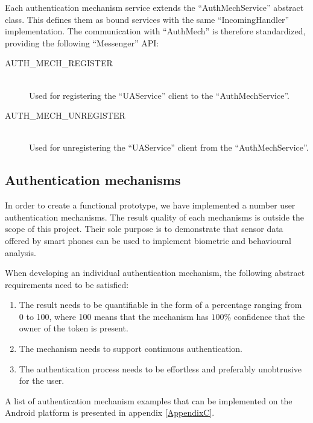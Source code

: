 Each authentication mechanism service extends the ``AuthMechService'' abstract class. This defines them as bound services with the same ``IncomingHandler'' implementation. The communication with ``AuthMech'' is therefore standardized, providing the following ``Messenger'' API:
\begin{description}
  \item[AUTH\_MECH\_REGISTER] \hfill \\
  Used for registering the ``UAService'' client to the ``AuthMechService''.
  
  \item[AUTH\_MECH\_UNREGISTER] \hfill \\
  Used for unregistering the ``UAService'' client from the ``AuthMechService''.
\end{description}    

  
\subsection{Authentication mechanisms}
\label{implauthmech}
In order to create a functional prototype, we have implemented a number user authentication mechanisms. The result quality of each mechanisms is outside the scope of this project. Their sole purpose is to demonstrate that sensor data offered by smart phones can be used to implement biometric and behavioural analysis.

When developing an individual authentication mechanism, the following abstract requirements need to be satisfied: 
\begin{enumerate}
	\item The result needs to be quantifiable in the form of a percentage ranging from 0 to 100, where 100 means that the mechanism has $100\%$ confidence that the owner of the token is present.
	\item The mechanism needs to support continuous authentication.
	\item The authentication process needs to be effortless and preferably unobtrusive for the user.
\end{enumerate}
A list of authentication mechanism examples that can be implemented on the Android platform is presented in appendix \ref{AppendixC}.

